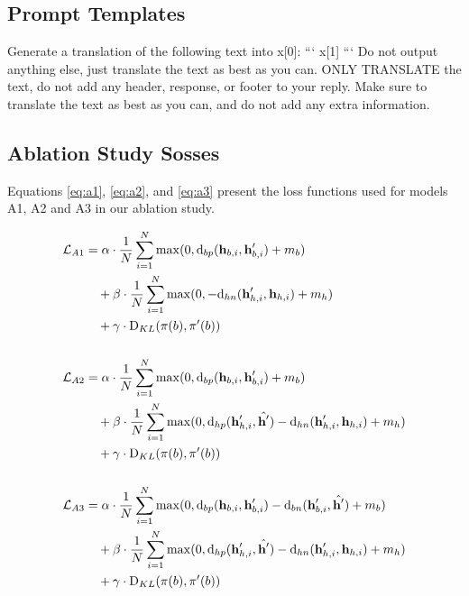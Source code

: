 \documentclass[11pt]{article}
\begin{document}
\subsection{Prompt Templates}
\label{app:prompts}
\begin{tcolorbox}[colback=gray!10, colframe=black, 
title=Prompt used for translations]
Generate a translation of the following text into {x[0]}:
```
{x[1]}
```
Do not output anything else, just translate the text as best as you can.
ONLY TRANSLATE the text, do not add any header, response, or footer to your reply.
Make sure to translate the text as best as you can, and do not add any extra information.
\end{tcolorbox}

\onecolumn
\subsection{Ablation Study Sosses}
\label{app:ablation_losses}

Equations \ref{eq:a1}, \ref{eq:a2}, and \ref{eq:a3} present the loss functions used for models A1, A2 and A3 in our ablation study.

\begin{align}
\mathcal{L}_{A1} &= \alpha \cdot \frac{1}{N} \sum_{i=1}^{N} \max(0, \text{d}_{bp}(\textbf{h}_{b,i}, \textbf{h}^\prime_{b,i}) + m_b) \nonumber \\
                 &\quad + \beta \cdot \frac{1}{N} \sum_{i=1}^{N} \max(0, -\text{d}_{hn}(\textbf{h}^\prime_{h,i}, \textbf{h}_{h,i}) + m_h) \nonumber \\
                 &\quad + \gamma \cdot \mathrm{D}_{KL}(\pi(b), \pi^\prime(b))
\label{eq:a1} \\[1.5em]
\mathcal{L}_{A2} &= \alpha \cdot \frac{1}{N} \sum_{i=1}^{N} \max(0, \text{d}_{bp}(\textbf{h}_{b,i}, \textbf{h}^\prime_{b,i}) + m_b) \nonumber \\
                 &\quad + \beta \cdot \frac{1}{N} \sum_{i=1}^{N} \max(0, \text{d}_{hp}(\textbf{h}^\prime_{h,i}, \hat{\textbf{h}^\prime}) - \text{d}_{hn}(\textbf{h}^\prime_{h,i}, \textbf{h}_{h,i}) + m_h) \nonumber \\
                 &\quad + \gamma \cdot \mathrm{D}_{KL}(\pi(b), \pi^\prime(b))
\label{eq:a2} \\[1.5em]
\mathcal{L}_{A3} &= \alpha \cdot \frac{1}{N} \sum_{i=1}^{N} \max(0, \text{d}_{bp}(\textbf{h}_{b,i}, \textbf{h}^\prime_{b,i}) - \text{d}_{bn}(\textbf{h}^\prime_{b,i}, \hat{\textbf{h}^\prime}) + m_b) \nonumber \\
                 &\quad + \beta \cdot \frac{1}{N} \sum_{i=1}^{N} \max(0, \text{d}_{hp}(\textbf{h}^\prime_{h,i}, \hat{\textbf{h}^\prime}) - \text{d}_{hn}(\textbf{h}^\prime_{h,i}, \textbf{h}_{h,i}) + m_h) \nonumber \\
                 &\quad + \gamma \cdot \mathrm{D}_{KL}(\pi(b), \pi^\prime(b))
\label{eq:a3}
\end{align}
\end{document}
